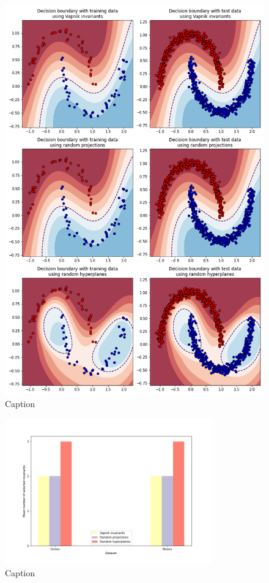 \begin{figure}
    \centering
    \includegraphics[width=\textwidth]{thesis/Figures/moons_decision_boundaries_ecoc.png}
    \caption{Caption}
    \label{fig:moons_decision_boundary_ecoc}
\end{figure}

\begin{figure}
    \centering
    \includegraphics[width=0.8\textwidth]{thesis/Figures/num_selected_invariants.png}
    \caption{Caption}
    \label{fig:toys_small_num_selected_invariants}
\end{figure}

